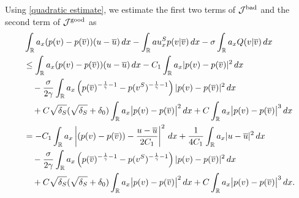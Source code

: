 \documentclass[11pt,reqno]{amsart}
\begin{document}
    Using \eqref{quadratic estimate}, we estimate the first two terms of $\mathcal{J}^{\textup{bad}}$ and the second term of $\mathcal{J}^{\textup{good}}$ as 
    \begin{align*}
        &\int_{\mathbb{R}}a_x (p(v)-p(\overline{v}))(u-\overline{u})\,dx-\int_{\mathbb{R}}au^S_xp(v|\overline{v})\,dx-\sigma\int_{\mathbb{R}}a_xQ(v|\overline{v})\,dx\\
        &\le  \int_{\mathbb{R}} a_x (p(v)-p(\overline{v}))(u-\overline{u})\,dx - C_1 \int_{\mathbb{R}} a_x |p(v)-p(\overline{v})|^2\, dx \\ 
        &\quad - \frac{\sigma}{2\gamma}\int_\mathbb{R} a_x \left( p(\overline{v})^{-\frac{1}{\gamma}-1} -p(v^S)^{-\frac{1}{\gamma}-1} \right) |p(v)-p(\overline{v})|^2\, dx \\ 
        &\quad +C\sqrt{\delta_S}(\sqrt{\delta_S}+\delta_0) \int_{\mathbb{R}} a_x\big|p(v)-p(\overline{v})\big|^2 \, d x+C\int_{\mathbb{R}} a_x\big|p(v)-p(\overline{v})\big|^3 \, d x\\
        &=  -C_1\int_{\mathbb{R}} a_x \left| (p(v) -p(\overline{v}))- \frac{u-\overline{u}}{2 C_1} \right|^2 \,dx+ \frac{1}{4C_1} \int_{\mathbb{R}}a_x |u-\overline{u}|^2\,dx \\ 
        &\quad - \frac{\sigma}{2\gamma}\int_\mathbb{R} a_x \left( p(\overline{v})^{-\frac{1}{\gamma}-1} -p(v^S)^{-\frac{1}{\gamma}-1} \right) |p(v)-p(\overline{v})|^2\, dx \\ 
        &\quad +C\sqrt{\delta_S}(\sqrt{\delta_S}+\delta_0) \int_{\mathbb{R}} a_x\big|p(v)-p(\overline{v})\big|^2 \, d x+C\int_{\mathbb{R}} a_x\big|p(v)-p(\overline{v})\big|^3 \, d x.
    \end{align*}
\end{document}
